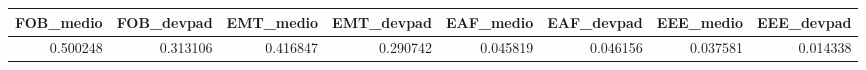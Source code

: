 \begin{tabular}{rrrrrrrr}
\toprule
 FOB\_medio &  FOB\_devpad &  EMT\_medio &  EMT\_devpad &  EAF\_medio &  EAF\_devpad &  EEE\_medio &  EEE\_devpad \\
\midrule
  0.500248 &    0.313106 &   0.416847 &    0.290742 &   0.045819 &    0.046156 &   0.037581 &    0.014338 \\
\bottomrule
\end{tabular}

